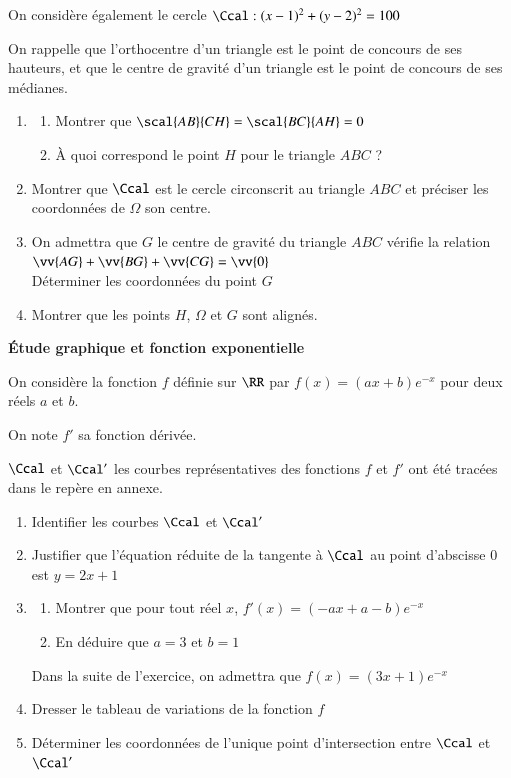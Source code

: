 \documentclass[oneside,12pt]{article}
\begin{document}
On considère également le cercle $\Ccal:(x-1)^2+(y-2)^2=100$

On rappelle que l'orthocentre d'un triangle est le point de concours de ses hauteurs, et que le centre de gravité d'un triangle est le point de concours de ses médianes.
\begin{enumerate}
	\item \begin{enumerate}
		\item Montrer que $\scal{AB}{CH}=\scal{BC}{AH}=0$
		\item À quoi correspond le point $H$ pour le triangle $ABC$ ?
	\end{enumerate}
	\item Montrer que $\Ccal$ est le cercle circonscrit au triangle $ABC$ et préciser les coordonnées de $\Omega$ son centre.
	\item On admettra que $G$ le centre de gravité du triangle $ABC$ vérifie la relation $\vv{AG}+\vv{BG}+\vv{CG}=\vv{0}$ \\
	Déterminer les coordonnées du point $G$
	\item Montrer que les points $H$, $\Omega$ et $G$ sont alignés.
\end{enumerate}



\newpage
\textbf{\huge Étude graphique et fonction exponentielle}

On considère la fonction $f$ définie sur $\RR$ par $f(x)=(ax+b)e^{-x}$ pour deux réels $a$ et $b$.

On note $f'$ sa fonction dérivée.

$\Ccal$ et $\Ccal'$ les courbes représentatives des fonctions $f$ et $f'$ ont été tracées dans le repère en annexe.
\begin{enumerate}
	\item Identifier les courbes $\Ccal$ et $\Ccal'$
	\item Justifier que l'équation réduite de la tangente à $\Ccal$ au point d'abscisse $0$ est $y=2x+1$
	\item \begin{enumerate}
		\item Montrer que pour tout réel $x$, $f'(x)=(-ax+a-b)e^{-x}$
		\item En déduire que $a=3$ et $b=1$
	\end{enumerate}
	Dans la suite de l'exercice, on admettra que $f(x)=(3x+1)e^{-x}$
	\item Dresser le tableau de variations de la fonction $f$
	\item Déterminer les coordonnées de l'unique point d'intersection entre $\Ccal$ et $\Ccal'$
\end{enumerate}
\end{document}

